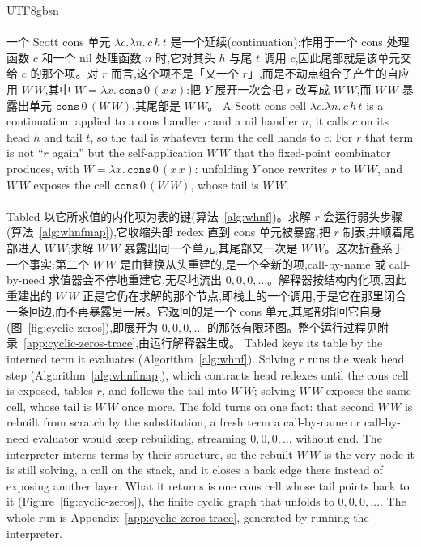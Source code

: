 \begin{CJK*}{UTF8}{gbsn}
  \paragraph{}
  \ifTablambdaChinese
  一个 Scott cons 单元 $\lambda c.\lambda n.\,c\,h\,t$ 是一个延续(continuation):作用于一个 cons 处理函数 $c$ 和一个 nil 处理函数 $n$ 时,它对其头 $h$ 与尾 $t$ 调用 $c$,因此尾部就是该单元交给 $c$ 的那个项。对 $r$ 而言,这个项不是「又一个 $r$」,而是不动点组合子产生的自应用 $W\,W$,其中 $W = \lambda x.\,\mathtt{cons}\,0\,(x\,x)$:把 $Y$ 展开一次会把 $r$ 改写成 $W\,W$,而 $W\,W$ 暴露出单元 $\mathtt{cons}\,0\,(W\,W)$,其尾部是 $W\,W$。
  \else
  A Scott cons cell $\lambda c.\lambda n.\,c\,h\,t$ is a continuation: applied to a cons handler $c$ and a nil handler $n$, it calls $c$ on its head $h$ and tail $t$, so the tail is whatever term the cell hands to $c$. For $r$ that term is not ``$r$ again'' but the self-application $W\,W$ that the fixed-point combinator produces, with $W = \lambda x.\,\mathtt{cons}\,0\,(x\,x)$: unfolding $Y$ once rewrites $r$ to $W\,W$, and $W\,W$ exposes the cell $\mathtt{cons}\,0\,(W\,W)$, whose tail is $W\,W$.
  \fi

  \paragraph{}
  \ifTablambdaChinese
  \textsf{Tabled} 以它所求值的内化项为表的键(算法~\ref{alg:whnf})。求解 $r$ 会运行弱头步骤(算法~\ref{alg:whnfmap}),它收缩头部 redex 直到 cons 单元被暴露,把 $r$ 制表,并顺着尾部进入 $W\,W$;求解 $W\,W$ 暴露出同一个单元,其尾部又一次是 $W\,W$。这次折叠系于一个事实:第二个 $W\,W$ 是由替换从头重建的,是一个全新的项,call-by-name 或 call-by-need 求值器会不停地重建它,无尽地流出 $0,0,0,\dots$。解释器按结构内化项,因此重建出的 $W\,W$ 正是它仍在求解的那个节点,即栈上的一个调用,于是它在那里闭合一条回边,而不再暴露另一层。它返回的是一个 cons 单元,其尾部指回它自身(图~\ref{fig:cyclic-zeros}),即展开为 $0,0,0,\dots$ 的那张有限环图。整个运行过程见附录~\ref{app:cyclic-zeros-trace},由运行解释器生成。
  \else
  \textsf{Tabled} keys its table by the interned term it evaluates (Algorithm~\ref{alg:whnf}). Solving $r$ runs the weak head step (Algorithm~\ref{alg:whnfmap}), which contracts head redexes until the cons cell is exposed, tables $r$, and follows the tail into $W\,W$; solving $W\,W$ exposes the same cell, whose tail is $W\,W$ once more. The fold turns on one fact: that second $W\,W$ is rebuilt from scratch by the substitution, a fresh term a call-by-name or call-by-need evaluator would keep rebuilding, streaming $0,0,0,\dots$ without end. The interpreter interns terms by their structure, so the rebuilt $W\,W$ is the very node it is still solving, a call on the stack, and it closes a back edge there instead of exposing another layer. What it returns is one cons cell whose tail points back to it (Figure~\ref{fig:cyclic-zeros}), the finite cyclic graph that unfolds to $0,0,0,\dots$. The whole run is Appendix~\ref{app:cyclic-zeros-trace}, generated by running the interpreter.
  \fi


\end{CJK*}
